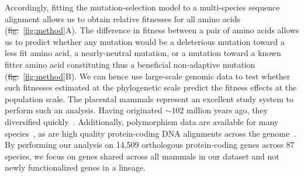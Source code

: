 \documentclass[10pt,letterpaper]{article}
\providecommand{\DIFaddtex}[1]{{\protect\color{blue}\uwave{#1}}} %
\providecommand{\DIFdeltex}[1]{{\protect\color{red}\sout{#1}}}                      %
\providecommand{\DIFaddbegin}{} %
\providecommand{\DIFaddend}{} %
\providecommand{\DIFdelbegin}{} %
\providecommand{\DIFdelend}{} %
\providecommand{\DIFadd}[1]{\texorpdfstring{\DIFaddtex{#1}}{#1}} %
\providecommand{\DIFdel}[1]{\texorpdfstring{\DIFdeltex{#1}}{}} %
\newcommand{\DIFscaledelfig}{0.5}
\newlength{\DIFdelgraphicswidth} %
\newlength{\DIFdelgraphicsheight} %
\newcommand{\DIFaddincludegraphics}[2][]{{\color{blue}\fbox{\DIFOincludegraphics[#1]{#2}}}} %
\newcommand{\DIFdelincludegraphics}[2][]{%
\sbox{\DIFdelgraphicsbox}{\DIFOincludegraphics[#1]{#2}}%
\settoboxwidth{\DIFdelgraphicswidth}{\DIFdelgraphicsbox} %
\settoboxtotalheight{\DIFdelgraphicsheight}{\DIFdelgraphicsbox} %
\scalebox{\DIFscaledelfig}{%
\parbox[b]{\DIFdelgraphicswidth}{\usebox{\DIFdelgraphicsbox}\\[-\baselineskip] \rule{\DIFdelgraphicswidth}{0em}}\llap{\resizebox{\DIFdelgraphicswidth}{\DIFdelgraphicsheight}{%
\setlength{\unitlength}{\DIFdelgraphicswidth}%
\begin{picture}(1,1)%
\thicklines\linethickness{2pt} %
{\color[rgb]{1,0,0}\put(0,0){\framebox(1,1){}}}%
{\color[rgb]{1,0,0}\put(0,0){\line( 1,1){1}}}%
{\color[rgb]{1,0,0}\put(0,1){\line(1,-1){1}}}%
\end{picture}%
}\hspace*{3pt}}} %
} %
\DeclareRobustCommand{\DIFaddbegin}{\DIFOaddbegin \let\includegraphics\DIFaddincludegraphics} %
\DeclareRobustCommand{\DIFaddend}{\DIFOaddend \let\includegraphics\DIFOincludegraphics} %
\DeclareRobustCommand{\DIFdelbegin}{\DIFOdelbegin \let\includegraphics\DIFdelincludegraphics} %
\DeclareRobustCommand{\DIFdelend}{\DIFOaddend \let\includegraphics\DIFOincludegraphics} %
\begin{document}
Accordingly, fitting the mutation-selection model to a multi-species sequence alignment allows us to obtain relative fitnesses for all amino acids (\DIFdelbegin \DIFdel{fig.}\DIFdelend \DIFaddbegin \DIFadd{Fig}\DIFaddend ~\ref{fig:method}A).
The difference in fitness between a pair of amino acids allows us to predict whether any mutation would be a deleterious mutation toward a less fit amino acid, a nearly-neutral mutation, or a mutation toward a known fitter amino acid constituting thus a beneficial non-adaptive mutation (\DIFdelbegin \DIFdel{fig.}\DIFdelend \DIFaddbegin \DIFadd{Fig}\DIFaddend ~\ref{fig:method}B).
We can hence use large-scale genomic data to test whether such fitnesses estimated at the phylogenetic scale predict the fitness effects at the population scale.
The placental mammals represent an excellent study system to perform such an analysis.
Having originated $\sim$102 million years ago, they diversified quickly~\cite{foley_genomic_2023}.
Additionally, polymorphism data are available for many species~\cite{howe_ensembl_2021}, as are high quality protein-coding DNA alignments across the genome~\cite{ranwez_orthomam_2007, scornavacca_orthomam_2019}.
By performing our analysis on 14,509 orthologous protein-coding genes across 87 species, we focus on genes shared across all mammals in our dataset and not newly functionalized genes in a lineage.
\end{document}
